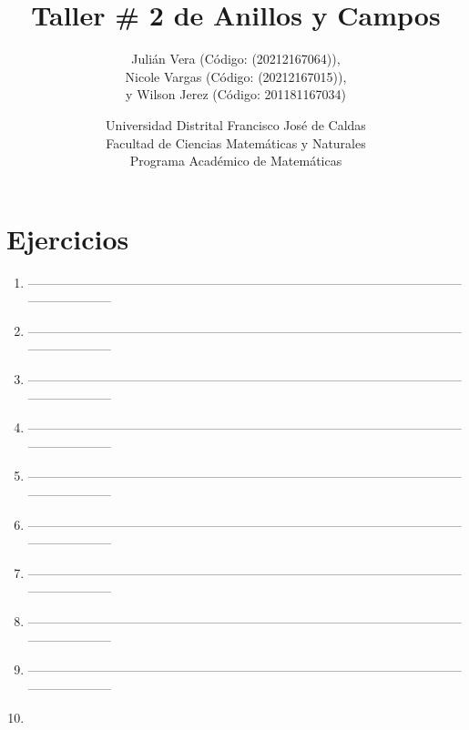 \documentclass[12pt]{article}
\title{Taller \# 2 de Anillos y Campos}
\author{
    Julián Vera (Código: (20212167064)), \\
    Nicole Vargas (Código: (20212167015)), \\
    y Wilson Jerez (Código: 201181167034)
}
\date{
    Universidad Distrital Francisco José de Caldas \\
    Facultad de Ciencias Matemáticas y Naturales \\
    Programa Académico de Matemáticas
}
\theoremstyle{definition}
\theoremstyle{remark}
\begin{document}
\maketitle

\section*{Ejercicios}

\begin{enumerate}
    \item 
--------------------------------------------------------------------------------------------------------------------------
    \item 
--------------------------------------------------------------------------------------------------------------------------
    \item 
    
--------------------------------------------------------------------------------------------------------------------------
    \item 
    
--------------------------------------------------------------------------------------------------------------------------
    \item 

--------------------------------------------------------------------------------------------------------------------------
    \item 
    
--------------------------------------------------------------------------------------------------------------------------
    \item 
    
--------------------------------------------------------------------------------------------------------------------------
    \item 
    
--------------------------------------------------------------------------------------------------------------------------

    \item 
    
--------------------------------------------------------------------------------------------------------------------------
    \item 
    

\end{enumerate}
\end{document}
